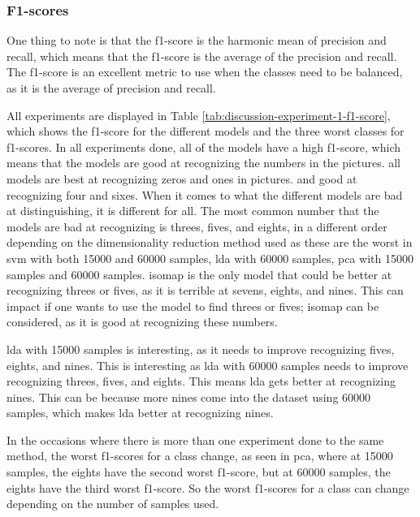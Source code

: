 \subsubsection{F1-scores}\label{subsec:discussion-experiment-1-f1-score}
One thing to note is that the f1-score is the harmonic mean of precision and recall, which means that the f1-score is the average of the precision and recall. The f1-score is an excellent metric to use when the classes need to be balanced, as it is the average of precision and recall.

All experiments are displayed in Table \ref{tab:discussion-experiment-1-f1-score}, which shows the f1-score for the different models and the three worst classes for f1-scores.
In all experiments done, all of the models have a high f1-score, which means that the models are good at recognizing the numbers in the pictures. all models are best at recognizing zeros and ones in pictures. and good at recognizing four and sixes. When it comes to what the different models are bad at distinguishing, it is different for all. The most common number that the models are bad at recognizing is threes, fives, and eights, in a different order depending on the dimensionality reduction method used as these are the worst in \gls{svm} with both 15000 and 60000 samples, \gls{lda} with 60000 samples, \gls{pca} with 15000 samples and 60000 samples. \gls{isomap} is the only model that could be better at recognizing threes or fives, as it is terrible at sevens, eights, and nines. This can impact if one wants to use the model to find threes or fives; \gls{isomap} can be considered, as it is good at recognizing these numbers.

\gls{lda} with 15000 samples is interesting, as it needs to improve recognizing fives, eights, and nines. This is interesting as \gls{lda} with 60000 samples needs to improve recognizing threes, fives, and eights. This means \gls{lda} gets better at recognizing nines. This can be because more nines come into the dataset using 60000 samples, which makes \gls{lda} better at recognizing nines. 

In the occasions where there is more than one experiment done to the same method, the worst f1-scores for a class change, as seen in \gls{pca}, where at 15000 samples, the eights have the second worst f1-score, but at 60000 samples, the eights have the third worst f1-score. So the worst f1-scores for a class can change depending on the number of samples used.

